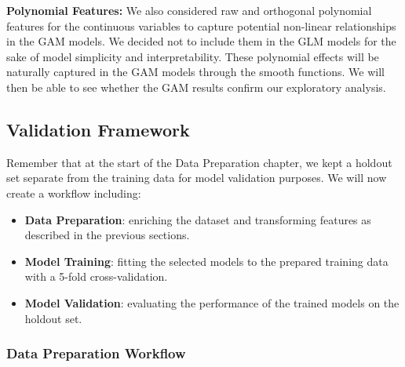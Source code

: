 \documentclass[
  english,
  11pt,
]{article}
\providecommand{\tightlist}{%
  \setlength{\itemsep}{0pt}\setlength{\parskip}{0pt}}
\begin{document}
\textbf{Polynomial Features:} We also considered raw and orthogonal
polynomial features for the continuous variables to capture potential
non-linear relationships in the GAM models. We decided not to include
them in the GLM models for the sake of model simplicity and
interpretability. These polynomial effects will be naturally captured in
the GAM models through the smooth functions. We will then be able to see
whether the GAM results confirm our exploratory analysis.

\subsection{Validation Framework}\label{validation-framework}

Remember that at the start of the Data Preparation chapter, we kept a
holdout set separate from the training data for model validation
purposes. We will now create a workflow including:

\begin{itemize}
\tightlist
\item
  \textbf{Data Preparation}: enriching the dataset and transforming
  features as described in the previous sections.
\item
  \textbf{Model Training}: fitting the selected models to the prepared
  training data with a 5-fold cross-validation.
\item
  \textbf{Model Validation}: evaluating the performance of the trained
  models on the holdout set.
\end{itemize}

\subsubsection{Data Preparation
Workflow}\label{data-preparation-workflow}
\end{document}
